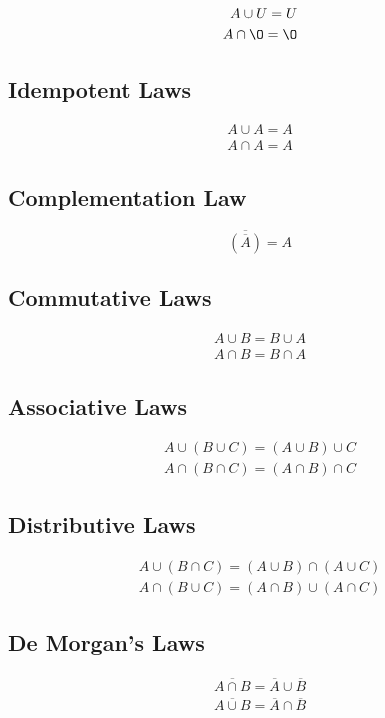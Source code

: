 \documentclass[12pt letter]{report}
\begin{document}
\begin{align*}
	A \cup U = U \\
	A \cap \O = \O
\end{align*}

\subsection{Idempotent Laws}

\begin{align*}
	A \cup A = A \\
	A \cap A = A
\end{align*}

\subsection{Complementation Law}
\[
	\overline{\left( \overline{A} \right) } = A
\]

\subsection{Commutative Laws}

\begin{align*}
	A \cup B = B \cup A \\
	A \cap B = B \cap A
\end{align*}

\subsection{Associative Laws}

\begin{align*}
	A \cup \left( B \cup  C \right)  = \left( A \cup B \right)  \cup C \\
	A \cap \left( B \cap C  \right)  = \left( A \cap B \right)  \cap C
\end{align*}

\subsection{Distributive Laws}

\begin{align*}
	A \cup \left( B \cap C \right)  = \left( A \cup B \right)  \cap \left( A \cup C \right) \\
	A \cap \left( B \cup C  \right)  = \left( A \cap B \right)  \cup \left( A \cap C \right)
\end{align*}

\subsection{De Morgan's Laws}
\begin{align*}
	\overline{A \cap  B} = \overline{A} \cup \overline{B} \\
	\overline{A \cup B } = \overline{A} \cap \overline{B}
\end{align*}
\end{document}
